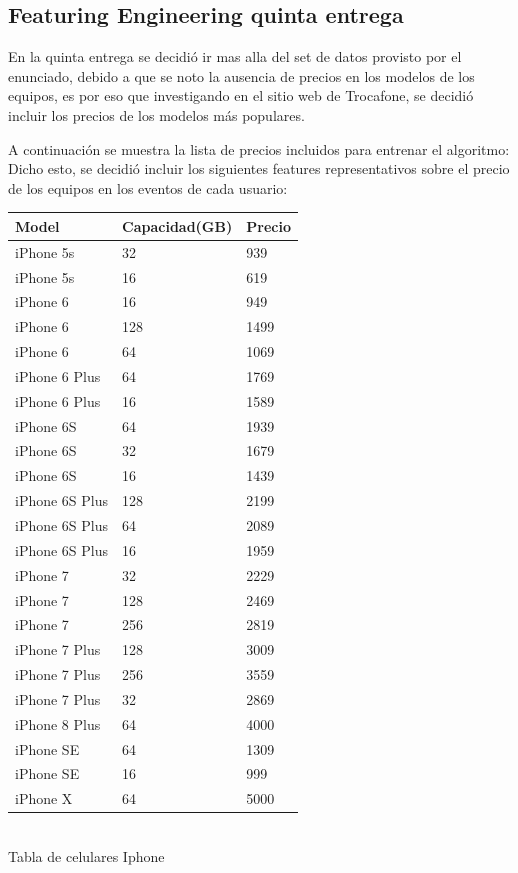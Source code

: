 \documentclass[a4paper ,12pt]{article}
\begin{document}
\newpage
\subsection{Featuring Engineering quinta entrega}

En la quinta entrega se decidió ir mas alla del set de datos provisto por el enunciado, debido a que se noto la ausencia de precios en 
los modelos de los equipos, es por eso que investigando en el sitio web de Trocafone, se decidió incluir los precios de los modelos más populares.

A continuación se muestra la lista de precios incluidos para entrenar el algoritmo:
Dicho esto, se decidió incluir los siguientes features representativos sobre el precio de los equipos en los eventos de cada usuario:

\begin{center}
	 	
		\begin{tabular}{lll}
			\hline
			Model&Capacidad(GB)&Precio \\
			\hline

			iPhone 5s&32&939 \\
			iPhone 5s&16&619 \\
			iPhone 6&16&949 \\
			iPhone 6&128&1499 \\
			iPhone 6&64&1069 \\
			iPhone 6 Plus&64&1769 \\
			iPhone 6 Plus&16&1589 \\
			iPhone 6S&64&1939\\
			iPhone 6S&32&1679\\
			iPhone 6S&16&1439\\
			iPhone 6S Plus&128&2199 \\
			iPhone 6S Plus&64&2089 \\
			iPhone 6S Plus&16&1959 \\
			iPhone 7&32&2229\\
			iPhone 7&128&2469\\
			iPhone 7&256&2819\\
			iPhone 7 Plus&128&3009 \\
			iPhone 7 Plus&256&3559 \\
			iPhone 7 Plus&32&2869 \\
			iPhone 8 Plus&64&4000 \\
			iPhone SE&64&1309 \\
			iPhone SE&16&999 \\
			iPhone X&64&5000 \\
			
		\hline
		\end{tabular}
	\\
	
	Tabla de celulares Iphone
\end{center}
\end{document}
